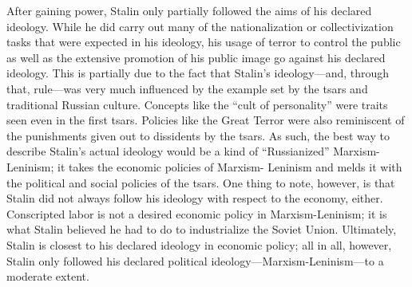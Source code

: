 \documentclass[a4paper,12pt]{article}
\begin{document}
    After gaining power, Stalin only partially followed the aims of his declared ideology. While he
    did carry out many of the nationalization or collectivization tasks that were expected in his
    ideology, his usage of terror to control the public as well as the extensive promotion of his
    public image go against his declared ideology. This is partially due to the fact that Stalin's
    ideology---and, through that, rule---was very much influenced by the example set by the tsars
    and traditional Russian culture. Concepts like the ``cult of personality'' were traits seen even
    in the first tsars. Policies like the Great Terror were also reminiscent of the punishments
    given out to dissidents by the tsars. As such, the best way to describe Stalin's actual ideology
    would be a kind of ``Russianized'' Marxism-Leninism; it takes the economic policies of Marxism-
    Leninism and melds it with the political and social policies of the tsars. One thing to note,
    however, is that Stalin did not always follow his ideology with respect to the economy, either.
    Conscripted labor is not a desired economic policy in Marxism-Leninism; it is what Stalin
    believed he had to do to industrialize the Soviet Union. Ultimately, Stalin is closest to his
    declared ideology in economic policy; all in all, however, Stalin only followed his declared
    political ideology---Marxism-Leninism---to a moderate extent.


    \printbibliography
\end{document}
